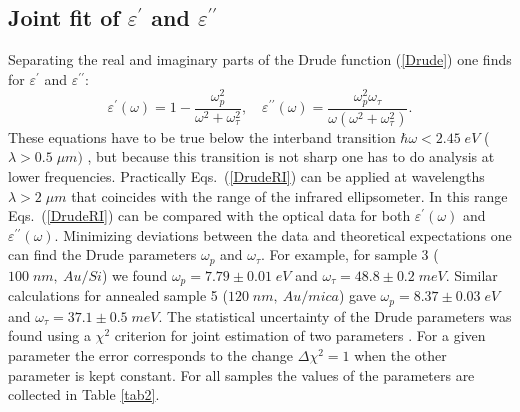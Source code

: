 \documentclass[prb]{revtex4}%
\begin{document}
\subsection{\label{Sec3A}Joint fit of $\varepsilon^{\prime}$ and $\varepsilon^{\prime\prime}$}
Separating the real and imaginary parts of the Drude function
(\ref{Drude}) one finds for $\varepsilon^{\prime}$ and
$\varepsilon^{\prime\prime}$:
%
\begin{equation}
\varepsilon ^{\prime }\left( \omega \right) =1-\frac{\omega
_{p}^{2}}{\omega ^{2}+\omega _{\tau }^{2}},\quad \varepsilon
^{\prime \prime }\left(\omega \right) =\frac{\omega _{p}^{2}\omega
_{\tau }}{\omega \left( \omega^{2}+\omega _{\tau }^{2}\right) }.
\label{DrudeRI}
\end{equation}
%
These equations have to be true below the interband transition
$\hbar\omega<2.45\;eV$ ($\lambda>0.5\;\mu m)$ \cite{The70}, but
because this transition is not sharp one has to do analysis at lower
frequencies. Practically Eqs.~(\ref{DrudeRI}) can be applied at
wavelengths $\lambda>2\;\mu m$ that coincides with the range of the
infrared ellipsometer. In this range Eqs.~(\ref{DrudeRI}) can be
compared with the optical data for both
$\varepsilon^{\prime}(\omega)$ and
$\varepsilon^{\prime\prime}(\omega)$. Minimizing deviations between
the data and theoretical expectations one can find the Drude
parameters $\omega_p$ and $\omega_{\tau}$. For example, for sample 3
($100\;nm,\ Au/Si$) we found $\omega_p=7.79\pm 0.01\;eV$ and
$\omega_{\tau}=48.8\pm 0.2\;meV$. Similar calculations for annealed
sample 5 ($120\;nm,\ Au/mica$) gave $\omega_p=8.37\pm 0.03\;eV$ and
$\omega_{\tau}=37.1\pm 0.5\;meV$. The statistical uncertainty of the
Drude parameters was found using a $\chi^2$ criterion for joint
estimation of two parameters \cite{Hag02}. For a given parameter the
error corresponds to the change $\Delta\chi^2 = 1$ when the other
parameter is kept constant. For all samples the values of the
parameters are collected in Table \ref{tab2}.
\end{document}
